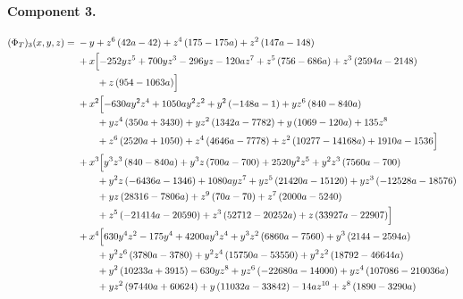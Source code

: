 \paragraph{Component 3.}
\begingroup
\footnotesize
\allowdisplaybreaks[4]
\begin{align*}
(\Phi_T)_3(x,y,z) ={}&- y + z^{6} \left(42 a - 42\right) + z^{4} \left(175 - 175 a\right) + z^{2} \left(147 a - 148\right)\\
&{}+x\Bigl[- 252 y z^{5} + 700 y z^{3} - 296 y z - 120 a z^{7} + z^{5} \left(756 - 686 a\right) + z^{3} \left(2594 a - 2148\right)\\
&\qquad + z \left(954 - 1063 a\right)\Bigr]\\
&{}+x^{2}\Bigl[- 630 a y^{2} z^{4} + 1050 a y^{2} z^{2} + y^{2} \left(- 148 a - 1\right) + y z^{6} \left(840 - 840 a\right)\\
&\qquad + y z^{4} \left(350 a + 3430\right) + y z^{2} \left(1342 a - 7782\right) + y \left(1069 - 120 a\right) + 135 z^{8}\\
&\qquad + z^{6} \left(2520 a + 1050\right) + z^{4} \left(4646 a - 7778\right) + z^{2} \left(10277 - 14168 a\right) + 1910 a - 1536\Bigr]\\
&{}+x^{3}\Bigl[y^{3} z^{3} \left(840 - 840 a\right) + y^{3} z \left(700 a - 700\right) + 2520 y^{2} z^{5} + y^{2} z^{3} \left(7560 a - 700\right)\\
&\qquad + y^{2} z \left(- 6436 a - 1346\right) + 1080 a y z^{7} + y z^{5} \left(21420 a - 15120\right) + y z^{3} \left(- 12528 a - 18576\right)\\
&\qquad + y z \left(28316 - 7806 a\right) + z^{9} \left(70 a - 70\right) + z^{7} \left(2000 a - 5240\right)\\
&\qquad + z^{5} \left(- 21414 a - 20590\right) + z^{3} \left(52712 - 20252 a\right) + z \left(33927 a - 22907\right)\Bigr]\\
&{}+x^{4}\Bigl[630 y^{4} z^{2} - 175 y^{4} + 4200 a y^{3} z^{4} + y^{3} z^{2} \left(6860 a - 7560\right) + y^{3} \left(2144 - 2594 a\right)\\
&\qquad + y^{2} z^{6} \left(3780 a - 3780\right) + y^{2} z^{4} \left(15750 a - 53550\right) + y^{2} z^{2} \left(18792 - 46644 a\right)\\
&\qquad + y^{2} \left(10233 a + 3915\right) - 630 y z^{8} + y z^{6} \left(- 22680 a - 14000\right) + y z^{4} \left(107086 - 210036 a\right)\\
&\qquad + y z^{2} \left(97440 a + 60624\right) + y \left(11032 a - 33842\right) - 14 a z^{10} + z^{8} \left(1890 - 3290 a\right)\\

\end{align*}
